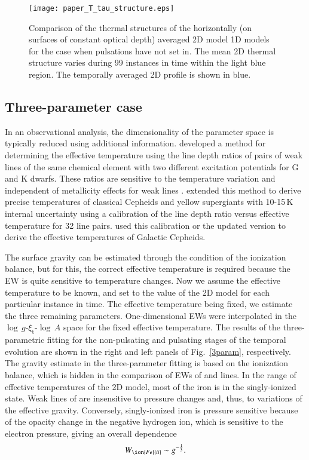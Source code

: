 \documentclass{aa}
\begin{document}
\begin{figure}
\texttt{[image: paper\_T\_tau\_structure.eps]}
\caption{Comparison of the thermal structures of the horizontally (on surfaces of
  constant optical depth) averaged 2D model 1D models for the case when
  pulsations have not set in.  The mean 2D thermal structure varies during 99
  instances in time within the light blue region. The temporally averaged 2D
  profile is shown in blue.}
\label{therm_struct}
\end{figure} 

\subsection{Three-parameter case}
In an observational analysis, the dimensionality  of 
the parameter space is typically reduced using additional information. 
\cite{1991PASP..103..439G} developed a method for  determining  the effective
temperature using the line depth ratios of pairs of weak lines of the same 
chemical element with two different excitation potentials for G and K dwarfs.
These ratios are  sensitive to the temperature variation  and  independent 
of metallicity effects for weak lines \citep{1994PASP..106.1248G}.  
\cite{2000A&A...358..587K} extended  this  method to derive precise 
temperatures of classical Cepheids and yellow supergiants with  
10-15\,K internal uncertainty using a calibration of the line depth
ratio versus effective temperature for 32 line pairs. 
\cite{2002A&A...381...32A, 2007A&A...467..283L,2011AJ....142...51L} used 
this calibration or the updated version \citep{2007MNRAS.378..617K} to derive 
the effective temperatures of Galactic Cepheids.

The surface gravity can be estimated through the condition of the ionization balance, but for this, the correct effective temperature
is required because the
EW is quite sensitive to temperature changes.  Now we assume the
effective temperature to be known, and set to the value of the 2D model for
each particular instance in time. The effective temperature being fixed, we
estimate the three remaining parameters.  One-dimensional EWs were interpolated in the
$\log\,g$-$\xi_\mathrm{t}$-$\log\,A$ space for the fixed effective
temperature. The results of the three-parametric fitting for the non-pulsating and
pulsating stages of the temporal evolution are shown in the right and left
panels of Fig.~\ref{3param}, respectively.  The gravity estimate
in the
three-parameter fitting is based on the ionization balance, which is hidden
in the comparison of EWs of  and 
lines. In the range of effective temperatures of the 2D model, most of the iron
is in the singly-ionized state.  Weak lines of  are insensitive to
pressure changes and, thus, to variations of the effective gravity.
Conversely, singly-ionized iron is pressure sensitive because
of the
opacity change in the negative hydrogen ion, which is sensitive to the electron
pressure, giving an overall dependence \citep{1992oasp.book.....G}
%
\begin{equation} \label{eq:grav}
W_{\ion{Fe}{ii}} \sim g^{-\frac{1}{3}}
.\end{equation}
\end{document}
